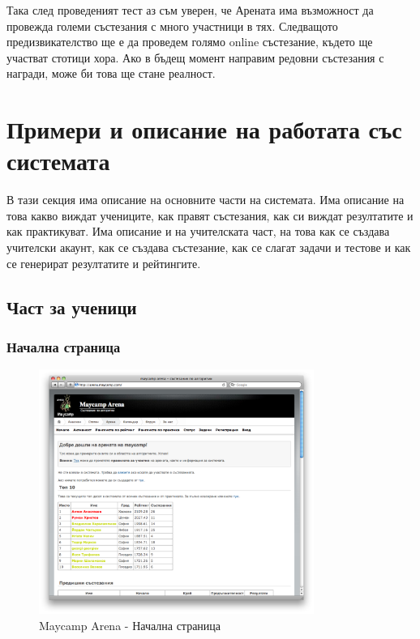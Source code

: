 \documentclass[a4paper,12pt]{article}
\begin{document}
  Така след проведеният тест аз съм уверен, че Арената има възможност да провежда големи състезания с много участници в тях. Следващото предизвикателство ще е да проведем голямо online състезание, където ще участват стотици хора. Ако в бъдещ момент направим редовни състезания с награди, може би това ще стане реалност. 
  
  \section{Примери и описание на работата със системата}
  В тази секция има описание на основните части на системата. Има описание на това какво виждат учениците, как правят състезания, как си виждат резултатите и как практикуват. Има описание и на учителската част, на това как се създава учителски акаунт, как се създава състезание, как се слагат задачи и тестове и как се генерират резултатите и рейтингите.

  \subsection{Част за ученици}
  \subsubsection{Начална страница}
  \begin{figure}[ht]
    \begin{center}
      \includegraphics[width=0.8\textwidth]{images/maycamp_arena_home.png}
    \end{center}
    \caption{Maycamp Arena - Начална страница}
    \label{arena_homepage}
  \end{figure}
\end{document}
